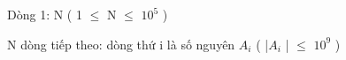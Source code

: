 Dòng 1: N ( 1  $\le$  N  $\le$  $10^{5}$   )  

   N dòng tiếp theo: dòng thứ  i  là số nguyên  $A_{i}$   ( |$A_{i}$   |  $\le$  $10^{9}$   )